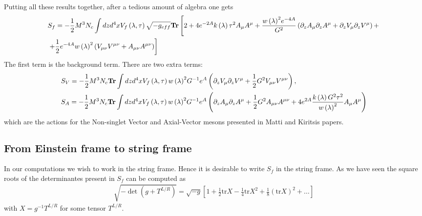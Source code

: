 \documentclass[10 pt]{article}
\begin{document}
Putting all these results together, after a tedious amount of algebra one gets
\begin{align}
&S_f = - \frac{1}{2} M^3 N_c \int dz d^4 x V_f \left(\lambda, \tau \right) \sqrt{- g_{eff}} \bold{Tr} \left[ 2 + 4 e^{-2A} k\left( \lambda \right) \tau^2 A_\mu A^\mu + \frac{{w\left(\lambda\right)}^2 e^{-4A}}{G^2} \left( \partial_z A_\mu \partial_z A^\mu +  \partial_z V_\mu \partial_z V^\mu \right) + \right. \\
&\left. + \frac{1}{2} e^{-4A} {w\left(\lambda\right)}^2 \left( V_{\mu \nu}V^{\mu \nu} + A_{\mu \nu} A^{\mu \nu} \right) \right]
\end{align}
The first term is the background term. There are two extra terms:
\begin{align}
&S_V = - \frac{1}{2} M^3 N_c \bold{Tr} \int dz d^4x V_{f} \left( \lambda, \tau \right) {w\left(\lambda\right)}^2 G^{-1} e^{A} \left( \partial_z V_\mu \partial_z V^\mu + \frac{1}{2} G^2 V_{\mu \nu} V^{\mu \nu} \right), \\
& S_A = - \frac{1}{2} M^3 N_c \bold{Tr} \int dz d^4 x V_{f} \left( \lambda, \tau \right) {w\left(\lambda\right)}^2 G^{-1} e^{A} \left( \partial_z A_\mu \partial_z A^\mu + \frac{1}{2} G^2 A_{\mu \nu} A^{\mu \nu} + 4 e^{2A} \frac{k\left(\lambda\right) G^2 \tau^2}{{w\left(\lambda\right)}^2} A_\mu A^\mu \right)
\end{align}
which are the actions for the Non-singlet Vector and Axial-Vector mesons presented in Matti and Kiritsis papers.

\subsection{From Einstein frame to string frame}

In our computations we wish to work in the string frame. Hence it is desirable to write $S_f$ in the string frame. As we have seen the square roots of the determinantes present in $S_f$ can be computed as
\begin{align}
\sqrt{-\det \left( g + T^{L/R} \right)} = \sqrt{-g} \left[ 1 + \frac{1}{2} \text{tr} X - \frac{1}{4} \text{tr} X^2 + \frac{1}{8} {\left( \text{tr} X \right)}^2 + \dots \right]
\end{align}
with $X = g^{-1} T^{L/R}$ for some tensor $T^{L/R}$.
\end{document}
